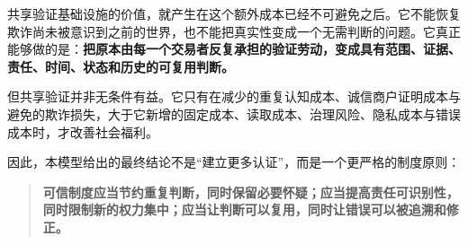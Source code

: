 \documentclass[UTF8,12pt]{ctexart}
\begin{document}
共享验证基础设施的价值，就产生在这个额外成本已经不可避免之后。它不能恢复欺诈尚未被意识到之前的世界，也不能把真实性变成一个无需判断的问题。它真正能够做的是：\textbf{把原本由每一个交易者反复承担的验证劳动，变成具有范围、证据、责任、时间、状态和历史的可复用判断。}

但共享验证并非无条件有益。它只有在减少的重复认知成本、诚信商户证明成本与避免的欺诈损失，大于它新增的固定成本、读取成本、治理风险、隐私成本与错误成本时，才改善社会福利。

因此，本模型给出的最终结论不是“建立更多认证”，而是一个更严格的制度原则：

\begin{quote}
\textbf{可信制度应当节约重复判断，同时保留必要怀疑；应当提高责任可识别性，同时限制新的权力集中；应当让判断可以复用，同时让错误可以被追溯和修正。}
\end{quote}



\end{document}
